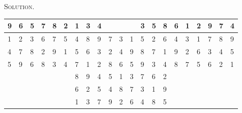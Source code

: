\documentclass[12pt, a4paper, oneside]{article}
\newenvironment{solution}{\par\noindent\textsc{Solution. }}{\\\par}
\begin{document}
\begin{solution}
\begin{table}[]
\begin{tabular}{llllll|l|l|l|lll|l|l|l|llllll}
				\multicolumn{1}{|l|}{9} & \multicolumn{1}{l|}{6} & \multicolumn{1}{l|}{5} & \multicolumn{1}{l|}{7} & \multicolumn{1}{l|}{8} & 2 & 1 & 3 & 4 &                        &                        &   & 3 & 5 & 8 & \multicolumn{1}{l|}{6} & \multicolumn{1}{l|}{1} & \multicolumn{1}{l|}{2} & \multicolumn{1}{l|}{9} & \multicolumn{1}{l|}{7} & \multicolumn{1}{l|}{4} \\ \hline
				\multicolumn{1}{|l|}{1} & \multicolumn{1}{l|}{2} & \multicolumn{1}{l|}{3} & \multicolumn{1}{l|}{6} & \multicolumn{1}{l|}{7} & 5 & 4 & 8 & 9 & \multicolumn{1}{l|}{7} & \multicolumn{1}{l|}{3} & 1 & 5 & 2 & 6 & \multicolumn{1}{l|}{4} & \multicolumn{1}{l|}{3} & \multicolumn{1}{l|}{1} & \multicolumn{1}{l|}{7} & \multicolumn{1}{l|}{8} & \multicolumn{1}{l|}{9} \\ \hline
				\multicolumn{1}{|l|}{4} & \multicolumn{1}{l|}{7} & \multicolumn{1}{l|}{8} & \multicolumn{1}{l|}{2} & \multicolumn{1}{l|}{9} & 1 & 5 & 6 & 3 & \multicolumn{1}{l|}{2} & \multicolumn{1}{l|}{4} & 9 & 8 & 7 & 1 & \multicolumn{1}{l|}{9} & \multicolumn{1}{l|}{2} & \multicolumn{1}{l|}{6} & \multicolumn{1}{l|}{3} & \multicolumn{1}{l|}{4} & \multicolumn{1}{l|}{5} \\ \hline
				\multicolumn{1}{|l|}{5} & \multicolumn{1}{l|}{9} & \multicolumn{1}{l|}{6} & \multicolumn{1}{l|}{8} & \multicolumn{1}{l|}{3} & 4 & 7 & 1 & 2 & \multicolumn{1}{l|}{8} & \multicolumn{1}{l|}{6} & 5 & 9 & 3 & 4 & \multicolumn{1}{l|}{8} & \multicolumn{1}{l|}{7} & \multicolumn{1}{l|}{5} & \multicolumn{1}{l|}{6} & \multicolumn{1}{l|}{2} & \multicolumn{1}{l|}{1} \\ \hline
				&                        &                        &                        &                        &   & 8 & 9 & 4 & \multicolumn{1}{l|}{5} & \multicolumn{1}{l|}{1} & 3 & 7 & 6 & 2 &                        &                        &                        &                        &                        &                        \\ \cline{7-15}
				&                        &                        &                        &                        &   & 6 & 2 & 5 & \multicolumn{1}{l|}{4} & \multicolumn{1}{l|}{8} & 7 & 3 & 1 & 9 &                        &                        &                        &                        &                        &                        \\ \cline{7-15}
				&                        &                        &                        &                        &   & 1 & 3 & 7 & \multicolumn{1}{l|}{9} & \multicolumn{1}{l|}{2} & 6 & 4 & 8 & 5 &                        &                        &                        &                        &                        &                        \\ \hline

\end{tabular}
\end{table}
\end{solution}
\end{document}
